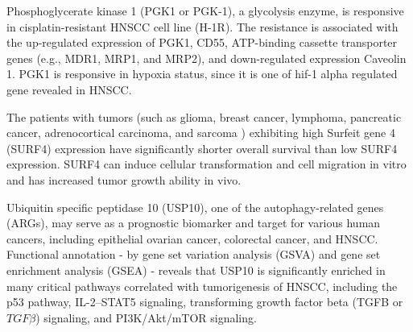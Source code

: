 \documentclass[jpm,article,submit,moreauthors,pdftex]{Definitions/mdpi}
\begin{document}
\begin{paracol}{2}

Phosphoglycerate kinase 1 (PGK1 or PGK-1), a glycolysis enzyme, is responsive in cisplatin-resistant HNSCC cell line (H-1R). 
The resistance is associated with the up-regulated expression of PGK1, CD55, ATP-binding cassette transporter genes (e.g., MDR1, MRP1, and MRP2), and down-regulated expression Caveolin 1\cite{Nakamura2005}.
PGK1 is responsive in hypoxia status, since it is one of \acrshort{hif}-1 alpha regulated gene revealed in HNSCC\cite{Peng2011}\cite{Shih2017}.

The patients with tumors (such as glioma, breast cancer, lymphoma, pancreatic cancer, adrenocortical carcinoma, and sarcoma%
) exhibiting high Surfeit gene 4 (SURF4) expression have significantly shorter overall survival than low SURF4 expression.
SURF4 can induce cellular transformation and cell migration in vitro and has increased tumor growth ability in vivo\cite{Kim2018a}.

Ubiquitin specific peptidase 10 (USP10), one of the autophagy-related genes (ARGs), may serve as a prognostic biomarker and target for various human cancers, including epithelial ovarian cancer, colorectal cancer, and HNSCC\cite{Ren2020}.
Functional annotation - by gene set variation analysis (GSVA) and gene set enrichment analysis (GSEA) - reveals that USP10 is significantly enriched in many critical pathways correlated with tumorigenesis of HNSCC, including the p53 pathway, IL-2–STAT5 signaling, transforming growth factor beta (TGFB or $TGF\beta$) signaling, and PI3K/Akt/mTOR signaling\cite{Ren2020}.


\end{paracol}
\end{document}
